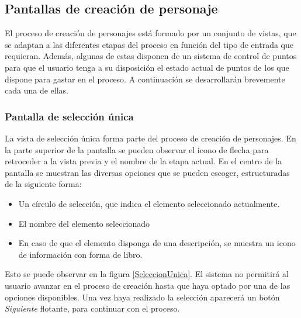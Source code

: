 \subsection{Pantallas de creación de personaje}
El proceso de creación de personajes está formado por un conjunto de vistas, que se adaptan a las diferentes etapas del 
proceso en función del tipo de entrada que requieran. Además, algunas de estas disponen de un sistema de control de puntos 
para que el usuario tenga a su disposición el estado actual de puntos de los que dispone para gastar en el proceso.
A continuación se desarrollarán brevemente cada una de ellas.

\subsubsection{Pantalla de selección única}
La vista de selección única forma parte del proceso de creación de personajes. En la parte superior de la 
pantalla se pueden observar el icono de flecha para retroceder a la vista previa y el nombre de la etapa actual.
En el centro de la pantalla se muestran las diversas opciones que se pueden escoger, estructuradas de la siguiente forma:
\begin{itemize}
    \item Un círculo de selección, que indica el elemento seleccionado actualmente.
    \item El nombre del elemento seleccionado
    \item En caso de que el elemento disponga de una descripción, se muestra un icono de información con forma de libro.
\end{itemize}
Esto se puede observar en la figura \ref*{SeleccionUnica}. El sistema no permitirá al usuario avanzar en el proceso de creación 
hasta que haya optado por una de las opciones disponibles. Una vez haya realizado la selección aparecerá un botón \textit{Siguiente}
flotante, para continuar con el proceso.

